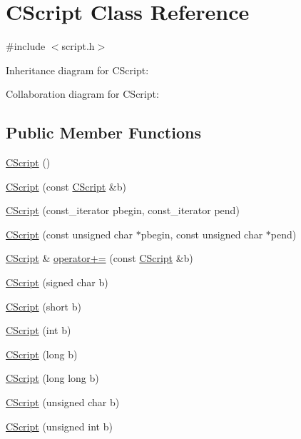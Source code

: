 \hypertarget{class_c_script}{}\section{C\+Script Class Reference}
\label{class_c_script}


{\ttfamily \#include $<$script.\+h$>$}



Inheritance diagram for C\+Script\+:


Collaboration diagram for C\+Script\+:
\subsection*{Public Member Functions}
\begin{DoxyCompactItemize}
\item 
\hyperlink{class_c_script_a92271d96c283ee9de8d73f42456ff363}{C\+Script} ()
\item 
\hyperlink{class_c_script_a32037617a2648c826f3685d17a46d6cf}{C\+Script} (const \hyperlink{class_c_script}{C\+Script} \&b)
\item 
\hyperlink{class_c_script_a06a47661695214630a2f41d4019b20f5}{C\+Script} (const\+\_\+iterator pbegin, const\+\_\+iterator pend)
\item 
\hyperlink{class_c_script_aa8d9ad6ecd9662b423b73294783396ce}{C\+Script} (const unsigned char $\ast$pbegin, const unsigned char $\ast$pend)
\item 
\hyperlink{class_c_script}{C\+Script} \& \hyperlink{class_c_script_af5c72a9c725a2c4f1432cc214d54cfd7}{operator+=} (const \hyperlink{class_c_script}{C\+Script} \&b)
\item 
\hyperlink{class_c_script_a56509326653f847006c21c70938cb896}{C\+Script} (signed char b)
\item 
\hyperlink{class_c_script_ad9275154073efebbeb1da8a81f1ad981}{C\+Script} (short b)
\item 
\hyperlink{class_c_script_ac0fdbf14458c5c33713a51582cdf1507}{C\+Script} (int b)
\item 
\hyperlink{class_c_script_a41d7433a08d75a1cd9f7cd449d07341c}{C\+Script} (long b)
\item 
\hyperlink{class_c_script_a2d77d733e711257c7481117b5dfb9945}{C\+Script} (long long b)
\item 
\hyperlink{class_c_script_ae1842fefe5cb1e9a8dd5b1fa6db12741}{C\+Script} (unsigned char b)
\item 
\hyperlink{class_c_script_a1e0a3f8b4dc8242c5a4999b03c2a29bb}{C\+Script} (unsigned int b)

\end{DoxyCompactItemize}
